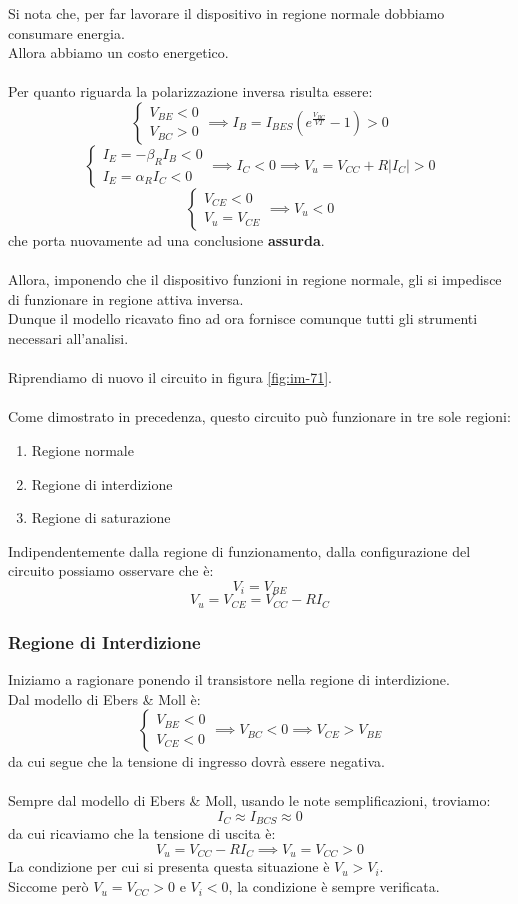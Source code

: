 \documentclass[../main.tex]{subfiles}
\begin{document}
	Si nota che, per far lavorare il dispositivo in regione normale dobbiamo consumare energia. \\
	Allora abbiamo un costo energetico.\\\\
	Per quanto riguarda la polarizzazione inversa risulta essere:
	$$\begin{cases} V_{BE} < 0 \\ V_{BC} > 0 \end{cases} \implies I_B = I_{BES} \left( e^{\frac{V_{BC}}{VT}} - 1 \right) > 0$$
	$$\begin{cases} I_E = -\beta_R I_B < 0 \\ I_E = \alpha_R I_C < 0 \end{cases} \implies I_C < 0 \implies V_u = V_{CC} + R |I_C| > 0$$
	$$\begin{cases} V_{CE} < 0 \\ V_u = V_{CE} \end{cases} \implies V_u < 0$$
	che porta nuovamente ad una conclusione \textbf{assurda}.\\\\
	Allora, imponendo che il dispositivo funzioni in regione normale, gli si impedisce di funzionare in regione attiva inversa. \\
	Dunque il modello ricavato fino ad ora fornisce comunque tutti gli strumenti necessari all’analisi.\\\\
	Riprendiamo di nuovo il circuito in figura \ref{fig:im-71}.\\\\
	Come dimostrato in precedenza, questo circuito può funzionare in tre sole regioni:
	\begin{enumerate}
		\item Regione normale
		\item Regione di interdizione
		\item Regione di saturazione
	\end{enumerate}
	Indipendentemente dalla regione di funzionamento, dalla configurazione del circuito possiamo osservare che è:
	$$V_i = V_{BE}$$
	$$V_u = V_{CE} = V_{CC} - RI_C$$
	\subsubsection{Regione di Interdizione}
	Iniziamo a ragionare ponendo il transistore nella regione di interdizione. \\
	Dal modello di Ebers \& Moll è:
	$$\begin{cases} V_{BE} < 0 \\ V_{CE} < 0 \end{cases} \implies V_{BC} < 0 \implies V_{CE} > V_{BE}$$
	da cui segue che la tensione di ingresso dovrà essere negativa.\\\\
	Sempre dal modello di Ebers \& Moll, usando le note semplificazioni, troviamo:
	$$I_C \approx I_{BCS} \approx 0$$
	da cui ricaviamo che la tensione di uscita è:
	$$V_u = V_{CC} - RI_C \implies V_u = V_{CC} > 0$$
	La condizione per cui si presenta questa situazione è $V_u > V_i$. \\
	Siccome però $V_u = V_{CC} > 0$ e $V_i < 0$, la condizione è sempre verificata.
\end{document}
